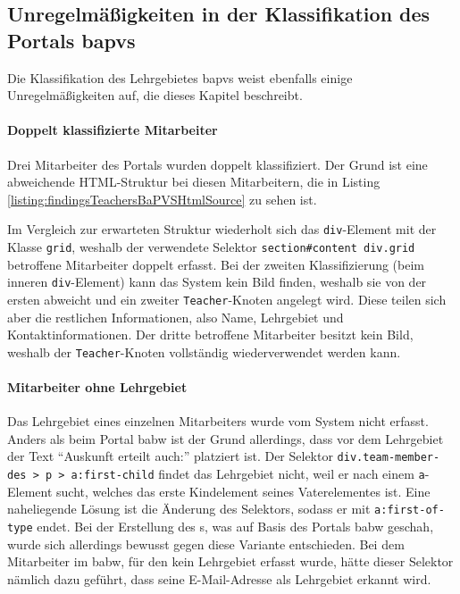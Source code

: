 \subsection{Unregelmäßigkeiten in der Klassifikation des Portals \acrshort{bapvs}}
    \label{section:findingsTeachersAbnormalitiesBaPVS}
    Die Klassifikation des Lehrgebietes \gls{bapvs}
    weist ebenfalls einige Unregelmäßigkeiten auf,
    die dieses Kapitel beschreibt.

    \paragraph{Doppelt klassifizierte Mitarbeiter}
    Drei Mitarbeiter des Portals wurden doppelt klassifiziert.
    Der Grund ist eine abweichende HTML-Struktur bei diesen Mitarbeitern,
    die in Listing \ref{listing:findingsTeachersBaPVSHtmlSource} zu sehen ist.

    

    Im Vergleich zur erwarteten Struktur wiederholt sich
    das \texttt{div}-Element mit der Klasse \texttt{grid},
    weshalb der verwendete Selektor \texttt{section\#content div.grid}
    betroffene Mitarbeiter doppelt erfasst.
    Bei der zweiten Klassifizierung
    (beim inneren \texttt{div}-Element) kann das System kein Bild finden,
    weshalb sie von der ersten abweicht und ein zweiter \texttt{Teacher}-Knoten angelegt wird.
    Diese teilen sich aber die restlichen Informationen,
    also Name, Lehrgebiet und Kontaktinformationen.
    Der dritte betroffene Mitarbeiter besitzt kein Bild,
    weshalb der \texttt{Teacher}-Knoten vollständig wiederverwendet werden kann.

    \paragraph{Mitarbeiter ohne Lehrgebiet}
    Das Lehrgebiet eines einzelnen Mitarbeiters wurde vom System nicht erfasst.
    Anders als beim Portal \gls{babw} ist der Grund allerdings,
    dass vor dem Lehrgebiet der Text "`Auskunft erteilt auch:"' platziert ist.
    Der Selektor \texttt{div.team-member-des > p > a:first-child} findet
    das Lehrgebiet nicht, weil er nach einem \texttt{a}-Element sucht,
    welches das erste Kindelement seines Vaterelementes ist.
    Eine naheliegende Lösung ist die Änderung des Selektors,
    sodass er mit \texttt{a:first-of-type} endet.
    Bei der Erstellung des {\classificationModel}s,
    was auf Basis des Portals \gls{babw} geschah,
    wurde sich allerdings bewusst gegen diese Variante entschieden.
    Bei dem Mitarbeiter im \gls{babw}, für den kein Lehrgebiet erfasst
    wurde,
    hätte dieser Selektor nämlich dazu geführt,
    dass seine E-Mail-Adresse als Lehrgebiet erkannt wird.

